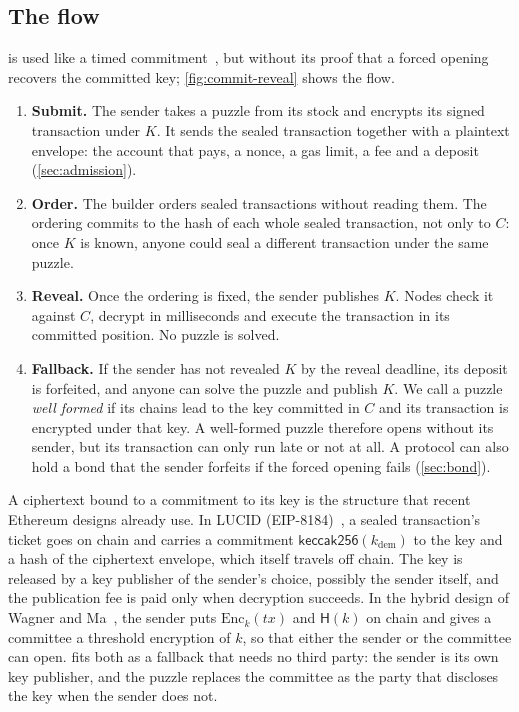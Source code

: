 \subsection{The flow}\label{sec:flow}

\leanseal is used like a timed commitment~\cite{BN00}, but without its proof that a forced opening recovers the committed key; \cref{fig:commit-reveal} shows the flow.
\begin{enumerate}[leftmargin=1.5em]
  \item \textbf{Submit.} The sender takes a puzzle from its stock and encrypts its signed transaction under $K$. It sends the sealed transaction together with a plaintext envelope: the account that pays, a nonce, a gas limit, a fee and a deposit (\cref{sec:admission}).
  \item \textbf{Order.} The builder orders sealed transactions without reading them. The ordering commits to the hash of each whole sealed transaction, not only to $C$: once $K$ is known, anyone could seal a different transaction under the same puzzle.
  \item \textbf{Reveal.} Once the ordering is fixed, the sender publishes $K$. Nodes check it against $C$, decrypt in milliseconds and execute the transaction in its committed position. No puzzle is solved.
  \item \textbf{Fallback.} If the sender has not revealed $K$ by the reveal deadline, its deposit is forfeited, and anyone can solve the puzzle and publish $K$. We call a puzzle \emph{well formed} if its chains lead to the key committed in $C$ and its transaction is encrypted under that key. A well-formed puzzle therefore opens without its sender, but its transaction can only run late or not at all. A protocol can also hold a bond that the sender forfeits if the forced opening fails (\cref{sec:bond}).
\end{enumerate}


A ciphertext bound to a commitment to its key is the structure that recent Ethereum designs already use. In LUCID (EIP-8184)~\cite{LUCID}, a sealed transaction's ticket goes on chain and carries a commitment $\mathsf{keccak256}(k_{\mathrm{dem}})$ to the key and a hash of the ciphertext envelope, which itself travels off chain. The key is released by a key publisher of the sender's choice, possibly the sender itself, and the publication fee is paid only when decryption succeeds. In the hybrid design of Wagner and Ma~\cite{WM25}, the sender puts $\mathrm{Enc}_k(\mathit{tx})$ and $\mathsf{H}(k)$ on chain and gives a committee a threshold encryption of $k$, so that either the sender or the committee can open. \leanseal fits both as a fallback that needs no third party: the sender is its own key publisher, and the puzzle replaces the committee as the party that discloses the key when the sender does not.


